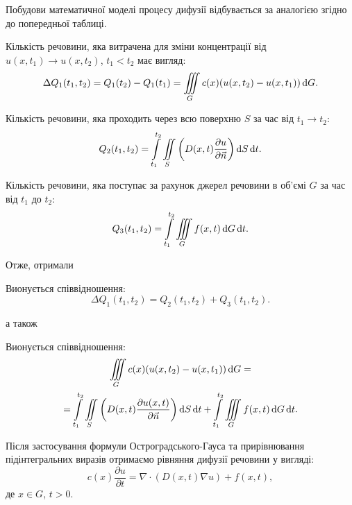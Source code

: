 Побудови математичної моделі процесу дифузії відбувається за аналогією згідно до попередньої таблиці. \medskip

Кількість речовини, яка витрачена для зміни концентрації від $u(x, t_1) \to u(x, t_2)$, $t_1 < t_2$ має вигляд:
\begin{equation}
	\Delta Q_1(t_1, t_2) = Q_1(t_2) - Q_1(t_1) = \displaystyle\iiint\limits_G c(x) (u(x, t_2) - u(x, t_1)) \mathop{}\!\mathrm{d} G.
\end{equation}

Кількість речовини, яка проходить через всю поверхню $S$ за час від $t_1 \to t_2$:
\begin{equation}
	Q_2(t_1, t_2) = \displaystyle\int\limits_{t_1}^{t_2} \displaystyle\iint\limits_S \left( D(x, t) \frac{\partial u}{\partial \vec n} \right) \mathop{}\!\mathrm{d} S \mathop{}\!\mathrm{d} t.
\end{equation}

Кількість речовини, яка поступає за рахунок джерел речовини в об'ємі $G$ за час від $t_1$ до $t_2$:
\begin{equation}
	Q_3(t_1, t_2) = \displaystyle\int\limits_{t_1}^{t_2} \displaystyle\iiint\limits_G f(x, t) \mathop{}\!\mathrm{d} G \mathop{}\!\mathrm{d} t.
\end{equation}

Отже, отримали 
\begin{law*}
	Вионується співвідношення:
	\begin{equation}
		\Delta Q_1(t_1, t_2) = Q_2(t_1, t_2) + Q_3(t_1, t_2).
	\end{equation}
\end{law*}
а також
\begin{law*}
	Вионується співвідношення:
	\begin{multline}
		\displaystyle\iiint\limits_G c(x) (u(x, t_2) - u(x, t_1)) \mathop{}\!\mathrm{d} G = \\
		= \displaystyle\int\limits_{t_1}^{t_2} \displaystyle\iint\limits_S \left( D(x, t) \frac{\partial u(x, t)}{\partial \vec n} \right) \mathop{}\!\mathrm{d} S \mathop{}\!\mathrm{d} t + \displaystyle\int\limits_{t_1}^{t_2} \displaystyle\iiint\limits_G f(x, t) \mathop{}\!\mathrm{d} G \mathop{}\!\mathrm{d} t.
	\end{multline}
\end{law*}

Після застосування формули Остроградського-Гауса та прирівнювання підінтегральних виразів отримаємо рівняння дифузії речовини у вигляді:
\begin{equation}
	c(x) \frac{\partial u}{\partial t} = \nabla \cdot (D(x, t) \nabla u) + f(x, t),
\end{equation}
де $x \in G$, $t > 0$. \medskip

